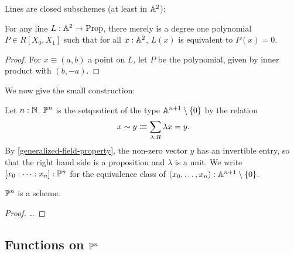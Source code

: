 Lines are closed subschemes (at least in $\mathbb{A}^2$):

\begin{proposition}%
  For any line $L : \mathbb{A}^{2}\to \mathrm{Prop}$, there merely is a degree one polynomial $P\in R[X_0,X_1]$ such that
  for all $x:\mathbb{A}^{2}$, $L(x)$ is equivalent to $P(x)=0$.
\end{proposition}

\begin{proof}
  For $x\equiv(a,b)$ a point on $L$,
  let $P$ be the polynomial, given by inner product with $(b,-a)$. 
\end{proof}

We now give the small construction:

\begin{definition}%
  \label{projective-space-hit}
  Let $n:\mathbb{N}$.
   $\mathbb{P}^n$ is the setquotient of the type $\mathbb{A}^{n+1}\setminus\{0\}$ by the relation
  \[
    x \sim y \colonequiv \sum_{\lambda : R} \lambda x=y\rlap{.}
  \]
  By \cref{generalized-field-property}, the non-zero vector $y$ has an invertible entry,
  so that the right hand side is a proposition and $\lambda$ is a unit.
  We write $[x_0:\dots:x_n]:\mathbb{P}^n$ for the equivalence class of $(x_0,\dots,x_n):\mathbb{A}^{n+1}\setminus\{0\}$.
\end{definition}

\begin{theorem}
  $\mathbb{P}^n$ is a scheme.
\end{theorem}

\begin{proof}
  \dots
\end{proof}

\subsection{Functions on $\mathbb{P}^n$}

